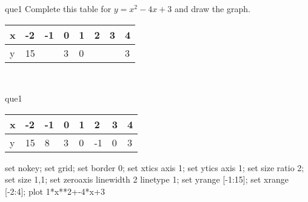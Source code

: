 \documentclass[13.5pt, varwidth=true]{beamer}
\begin{document}
\begin{frame}[shrink=19,fragile]
	\begin{beamercolorbox}[rounded=true, left, shadow=true,wd=14.8cm]{que1}
		 Complete this table for $y = x^{2} - 4x + 3$ and draw the graph. \\[0.3cm] \renewcommand{\arraystretch}{1.2}\begin{tabular}{|C|C|C|C|C|C|C|C|} \hline x & -2 & -1 & 0 & 1 & 2 & 3 & 4 \\ \hline y & 15 &  & 3 & 0 &  &  & 3\\ \hline \end{tabular}\\[0.3cm]
	\end{beamercolorbox}
\end{frame}
\begin{frame}[shrink=19,fragile]
	\begin{beamercolorbox}[rounded=true, left, shadow=true,wd=14.8cm]{que1}
		\renewcommand{\arraystretch}{1.2}\begin{tabular}{|C|C|C|C|C|C|C|C|} \hline x & -2 & -1 & 0 & 1 & 2 & 3 & 4 \\ \hline y & 15 & 8 & 3 & 0 & -1 & 0 & 3\\ \hline \end{tabular}\begin{gnuplot}[terminal=pdf] set nokey; set grid; set border 0; set xtics axis 1; set ytics axis 1; set size ratio 2; set size 1,1; set zeroaxis linewidth 2 linetype 1; set yrange [-1:15]; set xrange [-2:4]; plot 1*x**2+-4*x+3 \end{gnuplot}
	\end{beamercolorbox}
\end{frame}
\end{document}
